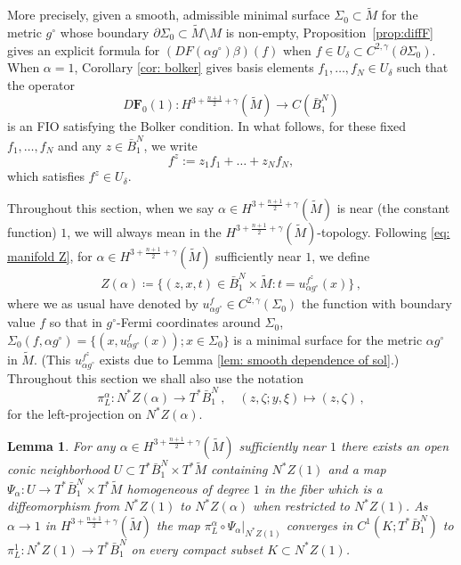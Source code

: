 \documentclass[11pt]{amsart}
\newtheorem{Lemma}[Theorem]{Lemma}
\theoremstyle{definition}
\numberwithin{equation}{section}
\begin{document}
More precisely, given a smooth, admissible minimal surface $\Sigma_0 \subset \widetilde{M}$ for the metric $g^\circ$ whose boundary $\partial\Sigma_0\subset \widetilde{M}\setminus M$ is non-empty, Proposition~\ref{prop:diffF} gives an explicit formula for $\left(DF(\alpha g^\circ)\beta\right)(f)$ when $f\in U_\delta\subset C^{2,\gamma}(\partial \Sigma_0)$. When $\alpha =1$, Corollary \ref{cor: bolker} gives basis elements $f_1,\dots, f_{N}\in U_\delta$ such that the operator 
$$ D\mathbf{F}_0(1):  H^{3+\frac{n+1}{2}+\gamma}(\widetilde{M}) \to C(\bar{B}_1^{N})$$
is an FIO satisfying the Bolker condition. In what follows, for these fixed $f_1,\dots,f_{N}$ and any $z\in \bar{B}_1^{N}$, we write
$$f^z := z_1 f_1 + \dots+ z_{N} f_{N},$$
which satisfies $f^z \in U_\delta$.

Throughout this section, when we say $\alpha \in H^{3+\frac{n+1}{2}+\gamma}(\widetilde{M})$ is near (the constant function) $1$, we will always mean in the $H^{3+\frac{n+1}{2}+\gamma}(\widetilde{M})$-topology. Following \eqref{eq: manifold Z}, for $\alpha \in H^{3+\frac{n+1}{2}+\gamma}(\widetilde{M})$ sufficiently near $1$, we define
\begin{eqnarray}\label{def: Z alpha}
	Z(\alpha) \coloneqq \{(z,x,t)\in \bar{B}_1^{N}\times\widetilde{M}\colon t=u^{f^z}_{\alpha g^\circ}(x)\}\,,
\end{eqnarray}
where we as usual have denoted by $u^{f}_{\alpha g^\circ} \in C^{2,\gamma}(\Sigma_0)$ the function with boundary value $f$ so that in $g^\circ$-Fermi coordinates around $\Sigma_0$, $\Sigma_0(f,\alpha g^\circ)=\{(x,u^{f}_{\alpha g^\circ}(x)); x\in \Sigma_0\}$ is a minimal surface for the metric $\alpha g^\circ$ in $\widetilde{M}$. (This $u^{f^z}_{\alpha g^\circ}$ exists due to Lemma \ref{lem: smooth dependence of sol}.) 
Throughout this section we shall also use the notation 
\[
	\pi_L^\alpha \colon N^\ast Z(\alpha)\to T^\ast \bar{B}_1^{N}\,,\quad (z,\zeta;y,\xi)\mapsto (z,\zeta)\,,
\]
for the left-projection on $N^\ast Z(\alpha)$.%
\begin{Lemma}\label{lem:canonical converge}
For any $\alpha \in H^{3+\frac{n+1}{2}+\gamma}(\widetilde{M})$ sufficiently near $1$ %
there exists an open conic neighborhood $U\subset T^*\bar{B}_1^{N} \times T^*\widetilde{M}$ containing $N^*Z(1)$ and a map $\Psi_\alpha \colon U \to T^*\bar{B}_1^{N} \times T^*\widetilde{M}$ homogeneous of degree $1$ in the fiber which is a diffeomorphism from $N^*Z(1)$ to $N^*Z(\alpha)$ when restricted to $N^*Z(1)$. 
As $\alpha \to 1$ in $H^{3+\frac{n+1}{2}+\gamma}(\widetilde{M})$ the map $\pi_L^\alpha\circ\Psi_\alpha\vert_{N^*Z(1)}$ converges in $C^1(K; T^*\bar B_1^{N})$ to $\pi_L^1 \colon N^*Z(1) \to T^\ast \bar{B}_1^{N}$ on every compact subset $K \subset N^*Z(1)$.%
\end{Lemma}
\end{document}
